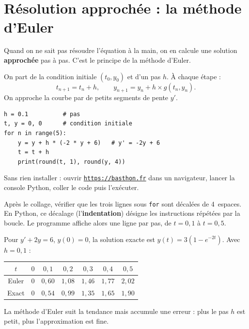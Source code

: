 \documentclass[a4paper,11pt]{article}
\begin{document}
\newpage
\section{Résolution approchée : la méthode d'Euler}

Quand on ne sait pas résoudre l'équation à la main, on en calcule une solution \textbf{approchée} pas à pas. C'est le principe de la méthode d'Euler.

\begin{methode}[-- Méthode d'Euler pour $y' = g(t, y)$]
On part de la condition initiale $(t_0, y_0)$ et d'un pas $h$. À chaque étape :
\[
t_{n+1} = t_n + h, \qquad y_{n+1} = y_n + h \times g(t_n, y_n).
\]
On approche la courbe par de petits segments de pente $y'$.
\end{methode}

\begin{lstlisting}[style=uimmpython, caption={Méthode d'Euler pour $y' = -2y + 6$, $y(0)=0$}]
h = 0.1          # pas
t, y = 0, 0      # condition initiale
for n in range(5):
    y = y + h * (-2 * y + 6)   # y' = -2y + 6
    t = t + h
    print(round(t, 1), round(y, 4))
\end{lstlisting}

\begin{remarque}
Sans rien installer : ouvrir \href{https://basthon.fr}{\texttt{https://basthon.fr}} dans un navigateur, lancer la console Python, coller le code puis l'exécuter.

Après le collage, vérifier que les trois lignes sous \texttt{for} sont décalées de 4~espaces. En Python, ce décalage (l'\textbf{indentation}) désigne les instructions répétées par la boucle. Le programme affiche alors une ligne par pas, de $t = 0{,}1$ à $t = 0{,}5$.
\end{remarque}

\begin{exemple}
Pour $y' + 2y = 6$, $y(0) = 0$, la solution exacte est $y(t) = 3(1 - e^{-2t})$. Avec $h = 0{,}1$ :
\begin{center}
\renewcommand{\arraystretch}{1.3}
\begin{tabular}{|c|c|c|c|c|c|c|}
\hline
\rowcolor{uimmlightblue}
$t$ & $0$ & $0{,}1$ & $0{,}2$ & $0{,}3$ & $0{,}4$ & $0{,}5$ \\
\hline
Euler & $0$ & $0{,}60$ & $1{,}08$ & $1{,}46$ & $1{,}77$ & $2{,}02$ \\
\hline
Exact & $0$ & $0{,}54$ & $0{,}99$ & $1{,}35$ & $1{,}65$ & $1{,}90$ \\
\hline
\end{tabular}
\end{center}
La méthode d'Euler suit la tendance mais accumule une erreur : plus le pas $h$ est petit, plus l'approximation est fine.
\end{exemple}
\end{document}
